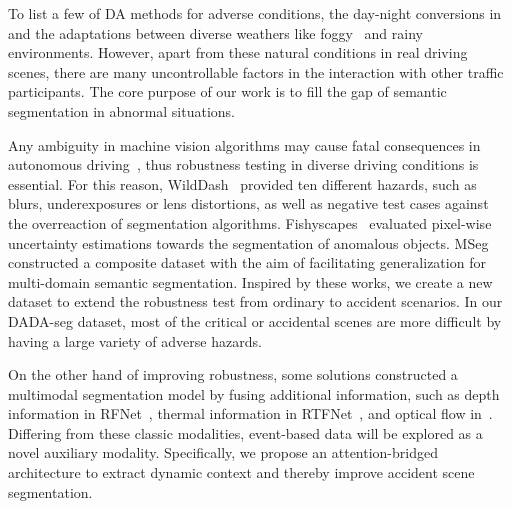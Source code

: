 \documentclass[journal]{IEEEtran}
\begin{document}
To list a few {of DA methods for adverse conditions}, the day-night conversions in~\cite{song2020nighttime} and the adaptations between diverse weathers like foggy~\cite{sakaridis2018modelAdapt_foggy} and rainy~\cite{di2020rainy} environments.
However, apart from these natural conditions in real driving scenes, there are many uncontrollable factors in the interaction with other traffic participants. The core purpose of our work is to fill the gap of semantic segmentation in abnormal situations.

Any ambiguity in machine vision algorithms may cause fatal consequences in autonomous driving~\cite{liu2020wasserstein}, thus robustness testing in diverse driving conditions is essential. For this reason, WildDash~\cite{zendel2018wilddash} provided ten different hazards, such as blurs, underexposures or lens distortions, as well as negative test cases against the overreaction of segmentation algorithms. Fishyscapes~\cite{blum2019fishyscapes} evaluated pixel-wise uncertainty estimations towards the segmentation of anomalous objects. MSeg~\cite{lambert2020mseg} constructed a composite dataset with the aim of facilitating generalization for multi-domain semantic segmentation.
Inspired by these works, we create a new dataset to extend the robustness test from ordinary to accident scenarios. In our DADA-seg dataset, most of the critical or accidental scenes are more difficult by having a large variety of adverse hazards.

On the other hand of improving robustness, some solutions constructed a multimodal segmentation model by fusing additional information, such as depth information in RFNet~\cite{sun2020rfnet}, thermal information in RTFNet~\cite{Y2019RTFNet_rgb_thermal}, and optical flow in~\cite{rashed2019optical_flow}.
Differing from these classic modalities, event-based data will be explored as a novel auxiliary modality. Specifically, we propose an attention-bridged architecture to extract dynamic context and thereby improve accident scene segmentation.
\end{document}
